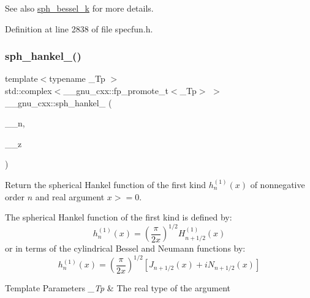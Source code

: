 \begin{DoxySeeAlso}{See also}
\hyperlink{group__gnu__math__spec__func_ga288b28f2c6995d052a4f5f17293cbf1a}{sph\+\_\+bessel\+\_\+k} for more details. 
\end{DoxySeeAlso}


Definition at line 2838 of file specfun.\+h.

\mbox{\label{group__gnu__math__spec__func_ga4424f565fb224ab88b177beb65d08305}} 
\subsubsection{\texorpdfstring{sph\+\_\+hankel\+\_()}{sph\_hankel\_1()}\hspace{0.1cm}{\footnotesize\ttfamily [1/2]}}
{\footnotesize\ttfamily template$<$typename \+\_\+\+Tp $>$ \\
std\+::complex$<$\+\_\+\+\_\+gnu\+\_\+cxx\+::fp\+\_\+promote\+\_\+t$<$\+\_\+\+Tp$>$ $>$ \+\_\+\+\_\+gnu\+\_\+cxx\+::sph\+\_\+hankel\+\_ (\begin{DoxyParamCaption}\item[{unsigned int}]{\+\_\+\+\_\+n,  }\item[{\+\_\+\+Tp}]{\+\_\+\+\_\+z }\end{DoxyParamCaption})\hspace{0.3cm}{\ttfamily [inline]}}

Return the spherical Hankel function of the first kind $ h^{(1)}_n(x) $ of nonnegative order $ n $ and real argument $ x >= 0 $.

The spherical Hankel function of the first kind is defined by\+: \[ h^{(1)}_n(x) = \left(\frac{\pi}{2x} \right) ^{1/2} H^{(1)}_{n+1/2}(x) \] or in terms of the cylindrical Bessel and Neumann functions by\+: \[ h^{(1)}_n(x) = \left(\frac{\pi}{2x} \right) ^{1/2} \left[ J_{n+1/2}(x) + iN_{n+1/2}(x) \right] \]


\begin{DoxyTemplParams}{Template Parameters}
{\em \+\_\+\+Tp} & The real type of the argument \\
\hline
\end{DoxyTemplParams}

